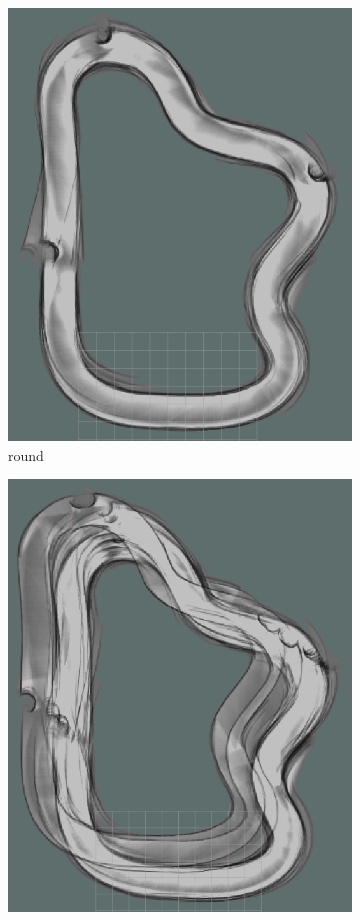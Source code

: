 \begin{figure}[H]
\begin{subfigure}{.3\linewidth}
		\includegraphics[width=\textwidth]{Pictures/3slamtest4}
		\caption{ round}
	\end{subfigure}
	\begin{subfigure}{.3\linewidth}
		\includegraphics[width=\textwidth]{Pictures/3slamtest10}

\end{subfigure}
\end{figure}
